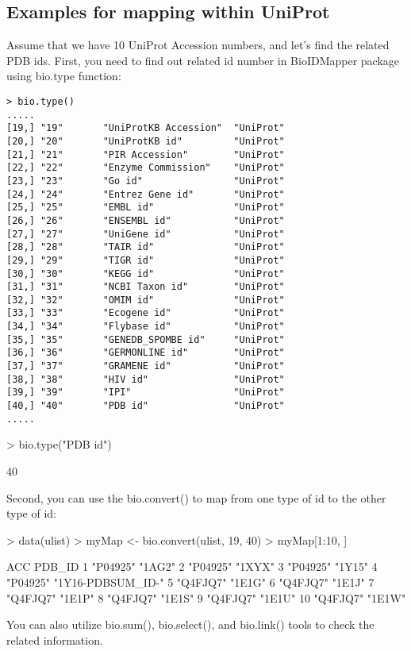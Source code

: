 \documentclass[a4paper]{article}
\begin{document}
\subsection{Examples for mapping within UniProt}

Assume that we have 10 UniProt Accession numbers, and let's find the related PDB ids.\newline
First, you need to find out related id number in BioIDMapper package using bio.type function:
\begin{verbatim}
> bio.type()
.....
[19,] "19"       "UniProtKB Accession"  "UniProt" 
[20,] "20"       "UniProtKB id"         "UniProt" 
[21,] "21"       "PIR Accession"        "UniProt" 
[22,] "22"       "Enzyme Commission"    "UniProt" 
[23,] "23"       "Go id"                "UniProt" 
[24,] "24"       "Entrez Gene id"       "UniProt" 
[25,] "25"       "EMBL id"              "UniProt" 
[26,] "26"       "ENSEMBL id"           "UniProt" 
[27,] "27"       "UniGene id"           "UniProt" 
[28,] "28"       "TAIR id"              "UniProt" 
[29,] "29"       "TIGR id"              "UniProt" 
[30,] "30"       "KEGG id"              "UniProt" 
[31,] "31"       "NCBI Taxon id"        "UniProt" 
[32,] "32"       "OMIM id"              "UniProt" 
[33,] "33"       "Ecogene id"           "UniProt" 
[34,] "34"       "Flybase id"           "UniProt" 
[35,] "35"       "GENEDB_SPOMBE id"     "UniProt" 
[36,] "36"       "GERMONLINE id"        "UniProt" 
[37,] "37"       "GRAMENE id"           "UniProt" 
[38,] "38"       "HIV id"               "UniProt" 
[39,] "39"       "IPI"                  "UniProt" 
[40,] "40"       "PDB id"               "UniProt"
.....
\end{verbatim}
\begin{Schunk}
\begin{Sinput}
> bio.type("PDB id")
\end{Sinput}
\begin{Soutput}
[1] 40
\end{Soutput}
\end{Schunk}
Second, you can use the bio.convert() to map from one type of id to the other type of id:
\begin{Schunk}
\begin{Sinput}
> data(ulist)
> myMap <- bio.convert(ulist, 19, 40)
> myMap[1:10, ]
\end{Sinput}
\begin{Soutput}
   ACC      PDB_ID           
1  "P04925" "1AG2"           
2  "P04925" "1XYX"           
3  "P04925" "1Y15"           
4  "P04925" "1Y16-PDBSUM_ID-"
5  "Q4FJQ7" "1E1G"           
6  "Q4FJQ7" "1E1J"           
7  "Q4FJQ7" "1E1P"           
8  "Q4FJQ7" "1E1S"           
9  "Q4FJQ7" "1E1U"           
10 "Q4FJQ7" "1E1W"           
\end{Soutput}
\end{Schunk}
You can also utilize bio.sum(), bio.select(), and bio.link() tools to check the related information.
\end{document}
